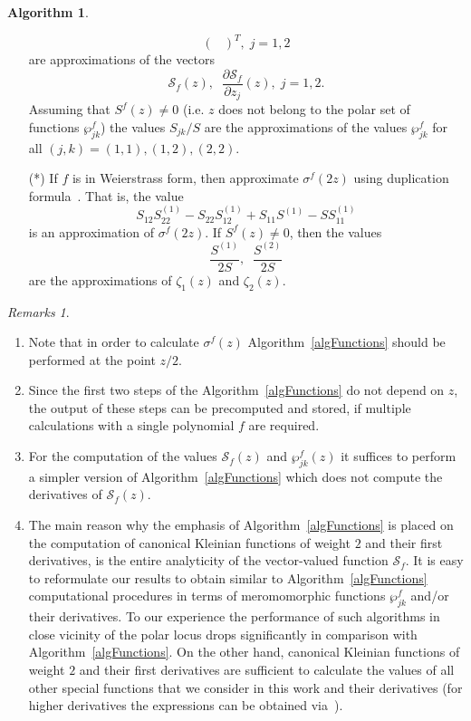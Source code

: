 \documentclass{amsart}
\numberwithin{equation}{section}
\theoremstyle{definition}
\newtheorem{algo}{Algorithm}[section]
\theoremstyle{remark}
\newtheorem*{remarks}{Remarks}
\begin{document}
\begin{algo}
\begin{enumerate}
\[\begin{pmatrix}
			\end{pmatrix}^T,\; j =1,2
			\]
			are approximations of the vectors
			\[
			\mathscr S_{f}(z), \;\;\frac{\partial \mathscr S_{f}}{\partial z_j}(z),\;j = 1,2.
			\]
			Assuming that $S^f(z) \ne 0$ (i.e. $z$ does not belong to the polar set of functions $\wp_{jk}^f$) the values $S_{jk}/S$ are the approximations of the values $\wp_{jk}^f$ for all $(j,k) = (1,1),(1,2),(2,2)$. 
			\item[(\arabic{enumi}*)] If $f$ is in Weierstrass form, then approximate $\sigma^f(2z)$ using duplication formula~\cite[Corollary~3.9]{KleinianWeight2}. That is, the value
			\[
			S_{12}S_{22}^{(1)} - S_{22}S_{12}^{(1)} + S_{11}S^{(1)} - SS_{11}^{(1)}
			\]
			is an approximation of $\sigma^f(2z)$. If $S^f(z) \ne 0$, then the values 
			\[
			\frac{S^{(1)}}{2S},\;\;\frac{S^{(2)}}{2S}
			\]
			are the approximations of $\zeta_1(z)$ and $\zeta_2(z)$.
		\end{enumerate}
	\end{algo}
	\begin{remarks} \hfill
		\begin{enumerate}[label=\arabic*.]
			\item Note that in order to calculate $\sigma^f(z)$ Algorithm~\ref{algFunctions} should be performed at the point $z/2$.
			\item Since the first two steps of the Algorithm~\ref{algFunctions} do not depend on $z$, the output of these steps can be precomputed and stored, if multiple calculations with a single polynomial $f$ are required.
			\item For the computation of the values $\mathscr S_f(z)$ and $\wp_{jk}^f(z)$ it suffices to perform a simpler version of Algorithm~\ref{algFunctions} which does not compute the derivatives of $\mathscr S_f(z)$.
			\item The main reason why the emphasis of Algorithm~\ref{algFunctions} is placed on the computation of canonical Kleinian functions of weight $2$ and their first derivatives, is the entire analyticity of the vector-valued function $\mathscr S_f$. It is easy to reformulate our results to obtain similar to Algorithm~\ref{algFunctions} computational procedures in terms of meromomorphic functions $\wp_{jk}^f$ and/or their derivatives. To our experience the performance of such algorithms in close vicinity of the polar locus drops significantly in comparison with Algorithm~\ref{algFunctions}. On the other hand, canonical Kleinian functions of weight $2$ and their first derivatives are sufficient to calculate the values of all other special functions that we consider in this work and their derivatives (for higher derivatives the expressions can be obtained via~\cite[Proposition~4.6]{KleinianWeight2}).
		\end{enumerate}
	\end{remarks}
	
\end{document}
